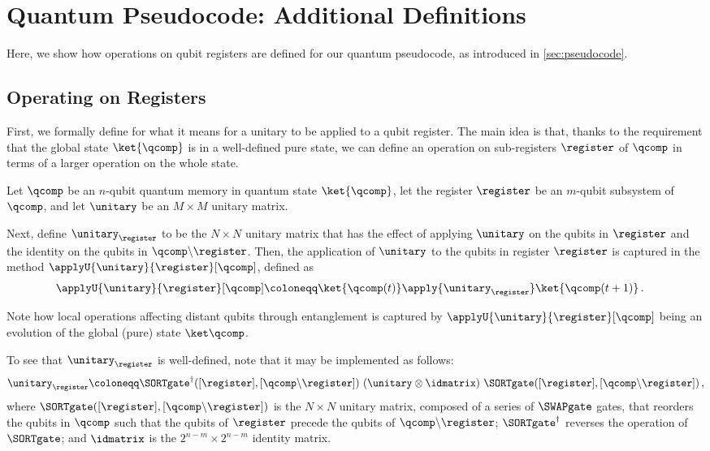 \section{Quantum Pseudocode: Additional Definitions}\label{sec:pseudocode-defs}
  Here, we show how operations on qubit registers are defined for
    our quantum pseudocode, as introduced in \cref{sec:pseudocode}.

  \subsection{Operating on Registers}
    First, we formally define for what it means for a unitary to be applied to
    a qubit register.
    The main idea is that, thanks to the requirement that the global state
    $\ket{\qcomp}$ is in a well-defined pure state, we can define an operation
    on sub-registers $\register$ of $\qcomp$ in terms of a larger operation on
    the whole state.

    \begin{definition}\label{def:apply}
      Let $\qcomp$ be an $n$-qubit quantum memory in quantum state
      $\ket{\qcomp}$, let the register $\register$ be an $m$-qubit
      subsystem of $\qcomp$, and let $\unitary$ be an
      $M \times M$ unitary matrix. 

      Next, define $\unitary_{\register}$ to be the $N \times N$ unitary matrix that
      has the effect of applying $\unitary$ on the qubits in $\register$ and the
      identity on the qubits in $\qcomp \backslash \register$.       
      Then, the application of $\unitary$ to the qubits in register $\register$ is
      captured in the method $\applyU{\unitary}{\register}[\qcomp]$, defined as
      \begin{align*}
        \applyU{\unitary}{\register}[\qcomp] &\coloneqq \ket{\qcomp(t)}
        \apply{\unitary_{\register}} \ket{\qcomp(t+1)}\, .
      \end{align*}
    \end{definition}

    \noindent
    Note how local operations affecting distant qubits through entanglement
      is captured by $\applyU{\unitary}{\register}[\qcomp]$ 
      being an evolution of the global (pure) state $\ket\qcomp$.
    
    To see that $\unitary_{\register}$ is well-defined, note that it may be
      implemented as follows:
      \[
        \unitary_{\register} \coloneqq \SORTgate^\dagger([\register], [\qcomp
        \backslash \register])\ (\unitary \otimes \idmatrix)\
        \SORTgate([\register], [\qcomp \backslash \register])\, ,
      \]
      where $\SORTgate([\register], [\qcomp \backslash \register])$ is the $N
      \times N$ unitary matrix, composed of a series of $\SWAPgate$ gates, that 
      reorders the qubits in $\qcomp$ such that the qubits of $\register$
      precede the qubits of $\qcomp \backslash \register$;
      $\SORTgate^\dagger$ reverses the operation of $\SORTgate$; and 
      $\idmatrix$ is the $2^{n-m} \times 2^{n-m}$ identity matrix.

